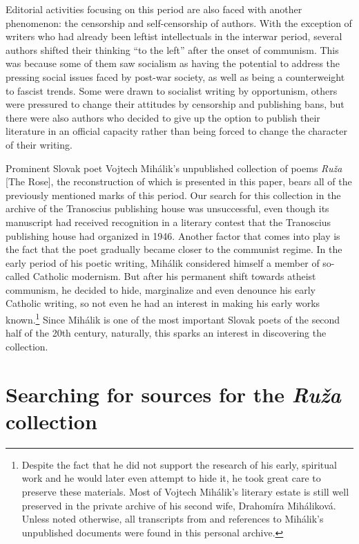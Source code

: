 \documentclass{article}
\begin{document}
Editorial activities focusing on this period are also faced with another
phenomenon: the censorship and self-censorship of authors. With the
exception of writers who had already been leftist intellectuals in the
interwar period, several authors shifted their thinking ``to the left''
after the onset of communism. This was because some of them saw
socialism as having the potential to address the pressing social issues
faced by post-war society, as well as being a counterweight to fascist
trends. Some were drawn to socialist writing by opportunism, others were
pressured to change their attitudes by censorship and publishing bans,
but there were also authors who decided to give up the option to publish
their literature in an official capacity rather than being forced to
change the character of their writing.

Prominent Slovak poet Vojtech Mihálik's unpublished collection of poems
\emph{Ruža} [The Rose], the reconstruction of which is presented in this paper,
bears all of the previously mentioned marks of this period. Our search
for this collection in the archive of the Tranoscius publishing house
was unsuccessful, even though its manuscript had received recognition in
a literary contest that the Tranoscius publishing house had organized in
1946. Another factor that comes into play is the fact that the poet
gradually became closer to the communist regime. In the early period of
his poetic writing, Mihálik considered himself a member of so-called
Catholic modernism. But after his permanent shift towards atheist
communism, he decided to hide, marginalize and even denounce his early
Catholic writing, so not even he had an interest in making his early
works known.\footnote{\label{foot:navratil1}Despite the fact that he did not support the
  research of his early, spiritual work and he would later even attempt
  to hide it, he took great care to preserve these materials. Most of
  Vojtech Mihálik's literary estate is still well preserved in the
  private archive of his second wife, Drahomíra Miháliková. Unless noted otherwise, all transcripts from and references to Mihálik's unpublished documents were found in this personal archive.} Since
Mihálik is one of the most important Slovak poets of the second half of
the 20th century, naturally, this sparks an interest in discovering the
collection.

\section{Searching for sources for the \emph{Ruža}
collection}
\end{document}
